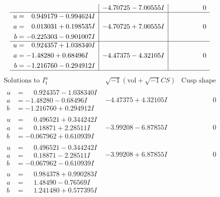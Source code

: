 \documentclass[1p]{elsarticle_modified}
\theoremstyle{definition}
\newcommand{\I}{\sqrt{-1}}
\begin{document}
$$\begin{array}{c|c|c}
 & -4.70725 - 7.00555 I & \phantom{-0.000000 } 0 \\ \hline\begin{aligned}
u &= \phantom{-}0.949179 - 0.994624 I \\
a &= \phantom{-}0.013031 + 0.198535 I \\
b &= -0.225303 - 0.901007 I\end{aligned}
 & -4.70725 + 7.00555 I & \phantom{-0.000000 } 0 \\ \hline\begin{aligned}
u &= \phantom{-}0.924357 + 1.038340 I \\
a &= -1.48280 + 0.68496 I \\
b &= -1.216760 - 0.294912 I\end{aligned}
 & -4.47375 - 4.32105 I & \phantom{-0.000000 } 0\\
 \hline 
 \end{array}$$\newpage$$\begin{array}{c|c|c}  
\text{Solutions to }I^u_{1}& \I (\text{vol} + \sqrt{-1}CS) & \text{Cusp shape}\\
 \hline 
\begin{aligned}
u &= \phantom{-}0.924357 - 1.038340 I \\
a &= -1.48280 - 0.68496 I \\
b &= -1.216760 + 0.294912 I\end{aligned}
 & -4.47375 + 4.32105 I & \phantom{-0.000000 } 0 \\ \hline\begin{aligned}
u &= \phantom{-}0.496521 + 0.344242 I \\
a &= \phantom{-}0.18871 + 2.28511 I \\
b &= -0.067962 + 0.610939 I\end{aligned}
 & -3.99208 - 6.87855 I & \phantom{-0.000000 } 0 \\ \hline\begin{aligned}
u &= \phantom{-}0.496521 - 0.344242 I \\
a &= \phantom{-}0.18871 - 2.28511 I \\
b &= -0.067962 - 0.610939 I\end{aligned}
 & -3.99208 + 6.87855 I & \phantom{-0.000000 } 0 \\ \hline\begin{aligned}
u &= \phantom{-}0.984378 + 0.990283 I \\
a &= \phantom{-}1.48490 - 0.76569 I \\
b &= \phantom{-}1.241480 + 0.577395 I\end{aligned}

\end{array}$$
\end{document}
